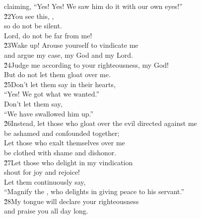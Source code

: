 \begin{poetry}
\poemll    claiming, ``Yes! Yes! We saw him do it with our own eyes!'' \\
\poeml \v{22}You see this, , \\
\poemll    so do not be silent. \\
\poemlll       Lord, do not be far from me! \\
\poeml \v{23}Wake up! Arouse yourself to vindicate me \\
\poemll    and argue my case, my God and my Lord. \\
\poeml \v{24}Judge me according to your righteousness,  my God! \\
\poemll    But do not let them gloat over me. \\
\poeml \v{25}Don't let them say in their hearts, \\
\poemll    ``Yes! We got what we wanted.'' \\
\poeml Don't let them say, \\
\poemll    ``We have swallowed him up.'' \\
\poeml \v{26}Instead, let those who gloat over the evil directed against me \\
\poemll    be ashamed and confounded together; \\
\poeml Let those who exalt themselves over me \\
\poemll    be clothed with shame and dishonor. \\
\poeml \v{27}Let those who delight in my vindication \\
\poemll    shout for joy and rejoice! \\
\poeml Let them continuously say, \\
\poemll    ``Magnify the , who delights in giving peace to his servant.'' \\
\poeml \v{28}My tongue will declare your righteousness \\
\poemll    and praise you all day long.
\end{poetry}

